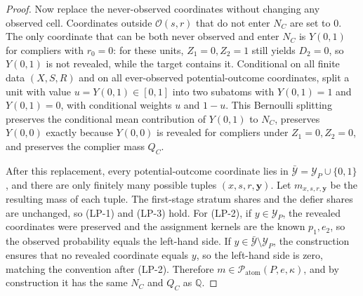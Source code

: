 \documentclass[11pt]{article}
\theoremstyle{definition}
\theoremstyle{plain}
\theoremstyle{remark}
\begin{document}
\begin{proof}
Now replace the never-observed coordinates without changing any observed cell.
Coordinates outside \(\mathcal O(s,r)\) that do not enter \(N_C\) are set to \(0\).
The only coordinate that can be both never observed and enter \(N_C\) is \(Y(0,1)\) for compliers with \(r_0=0\): for these units, \(Z_1=0,Z_2=1\) still yields \(D_2=0\), so \(Y(0,1)\) is not revealed, while the target contains it.
Conditional on all finite data \((X,S,R)\) and on all ever-observed potential-outcome coordinates, split a unit with value \(u=Y(0,1)\in[0,1]\) into two subatoms with \(Y(0,1)=1\) and \(Y(0,1)=0\), with conditional weights \(u\) and \(1-u\).
This Bernoulli splitting preserves the conditional mean contribution of \(Y(0,1)\) to \(N_C\), preserves \(Y(0,0)\) exactly because \(Y(0,0)\) is revealed for compliers under \(Z_1=0,Z_2=0\), and preserves the complier mass \(Q_C\).

After this replacement, every potential-outcome coordinate lies in \(\bar{\mathcal Y}=\mathcal Y_P\cup\{0,1\}\), and there are only finitely many possible tuples \((x,s,r,\mathbf y)\).
Let \(m_{x,s,r,\mathbf y}\) be the resulting mass of each tuple.
The first-stage stratum shares and the defier shares are unchanged, so (LP-1) and (LP-3) hold.
For (LP-2), if \(y\in\mathcal Y_P\), the revealed coordinates were preserved and the assignment kernels are the known \(p_1,e_2\), so the observed probability equals the left-hand side.
If \(y\in\bar{\mathcal Y}\setminus\mathcal Y_P\), the construction ensures that no revealed coordinate equals \(y\), so the left-hand side is zero, matching the convention after (LP-2).
Therefore \(m\in\mathcal P_{\mathrm{atom}}(P,e,\kappa)\), and by construction it has the same \(N_C\) and \(Q_C\) as \(\mathbb Q\).
\end{proof}
\end{document}
